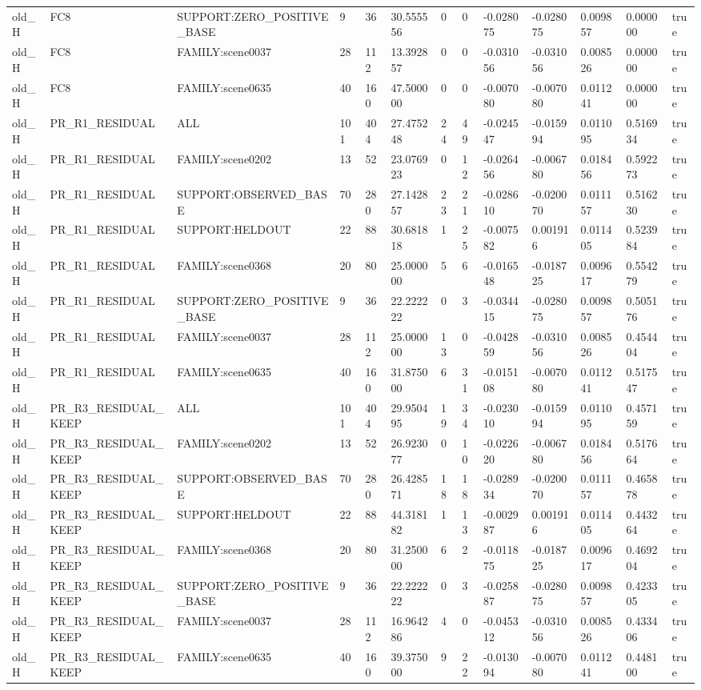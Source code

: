 \begin{tabular}{lllllllllllll}
old\_H & FC8 & SUPPORT:ZERO\_POSITIVE\_BASE & 9 & 36 & 30.555556 & 0 & 0 & -0.028075 & -0.028075 & 0.009857 & 0.000000 & true \\
old\_H & FC8 & FAMILY:scene0037 & 28 & 112 & 13.392857 & 0 & 0 & -0.031056 & -0.031056 & 0.008526 & 0.000000 & true \\
old\_H & FC8 & FAMILY:scene0635 & 40 & 160 & 47.500000 & 0 & 0 & -0.007080 & -0.007080 & 0.011241 & 0.000000 & true \\
old\_H & PR\_R1\_RESIDUAL & ALL & 101 & 404 & 27.475248 & 24 & 49 & -0.024547 & -0.015994 & 0.011095 & 0.516934 & true \\
old\_H & PR\_R1\_RESIDUAL & FAMILY:scene0202 & 13 & 52 & 23.076923 & 0 & 12 & -0.026456 & -0.006780 & 0.018456 & 0.592273 & true \\
old\_H & PR\_R1\_RESIDUAL & SUPPORT:OBSERVED\_BASE & 70 & 280 & 27.142857 & 23 & 21 & -0.028610 & -0.020070 & 0.011157 & 0.516230 & true \\
old\_H & PR\_R1\_RESIDUAL & SUPPORT:HELDOUT & 22 & 88 & 30.681818 & 1 & 25 & -0.007582 & 0.001916 & 0.011405 & 0.523984 & true \\
old\_H & PR\_R1\_RESIDUAL & FAMILY:scene0368 & 20 & 80 & 25.000000 & 5 & 6 & -0.016548 & -0.018725 & 0.009617 & 0.554279 & true \\
old\_H & PR\_R1\_RESIDUAL & SUPPORT:ZERO\_POSITIVE\_BASE & 9 & 36 & 22.222222 & 0 & 3 & -0.034415 & -0.028075 & 0.009857 & 0.505176 & true \\
old\_H & PR\_R1\_RESIDUAL & FAMILY:scene0037 & 28 & 112 & 25.000000 & 13 & 0 & -0.042859 & -0.031056 & 0.008526 & 0.454404 & true \\
old\_H & PR\_R1\_RESIDUAL & FAMILY:scene0635 & 40 & 160 & 31.875000 & 6 & 31 & -0.015108 & -0.007080 & 0.011241 & 0.517547 & true \\
old\_H & PR\_R3\_RESIDUAL\_KEEP & ALL & 101 & 404 & 29.950495 & 19 & 34 & -0.023010 & -0.015994 & 0.011095 & 0.457159 & true \\
old\_H & PR\_R3\_RESIDUAL\_KEEP & FAMILY:scene0202 & 13 & 52 & 26.923077 & 0 & 10 & -0.022620 & -0.006780 & 0.018456 & 0.517664 & true \\
old\_H & PR\_R3\_RESIDUAL\_KEEP & SUPPORT:OBSERVED\_BASE & 70 & 280 & 26.428571 & 18 & 18 & -0.028934 & -0.020070 & 0.011157 & 0.465878 & true \\
old\_H & PR\_R3\_RESIDUAL\_KEEP & SUPPORT:HELDOUT & 22 & 88 & 44.318182 & 1 & 13 & -0.002987 & 0.001916 & 0.011405 & 0.443264 & true \\
old\_H & PR\_R3\_RESIDUAL\_KEEP & FAMILY:scene0368 & 20 & 80 & 31.250000 & 6 & 2 & -0.011875 & -0.018725 & 0.009617 & 0.469204 & true \\
old\_H & PR\_R3\_RESIDUAL\_KEEP & SUPPORT:ZERO\_POSITIVE\_BASE & 9 & 36 & 22.222222 & 0 & 3 & -0.025887 & -0.028075 & 0.009857 & 0.423305 & true \\
old\_H & PR\_R3\_RESIDUAL\_KEEP & FAMILY:scene0037 & 28 & 112 & 16.964286 & 4 & 0 & -0.045312 & -0.031056 & 0.008526 & 0.433406 & true \\
old\_H & PR\_R3\_RESIDUAL\_KEEP & FAMILY:scene0635 & 40 & 160 & 39.375000 & 9 & 22 & -0.013094 & -0.007080 & 0.011241 & 0.448100 & true \\
\bottomrule
\end{tabular}
